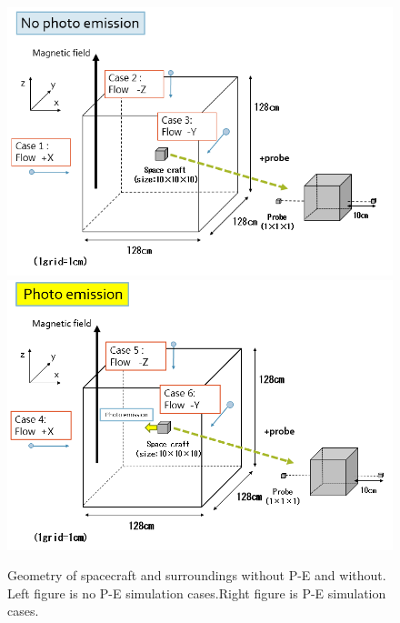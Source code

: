 \begin{figure}
        \includegraphics[width = 0.5 \textwidth]{images/picture_simulation1.png}
        \includegraphics[width = 0.5 \textwidth]{images/picture_simulation2-2.png}
        \caption{Geometry of spacecraft and surroundings without P-E and without. Left figure is no P-E simulation cases.Right figure is P-E simulation cases.}
    \end{figure}
